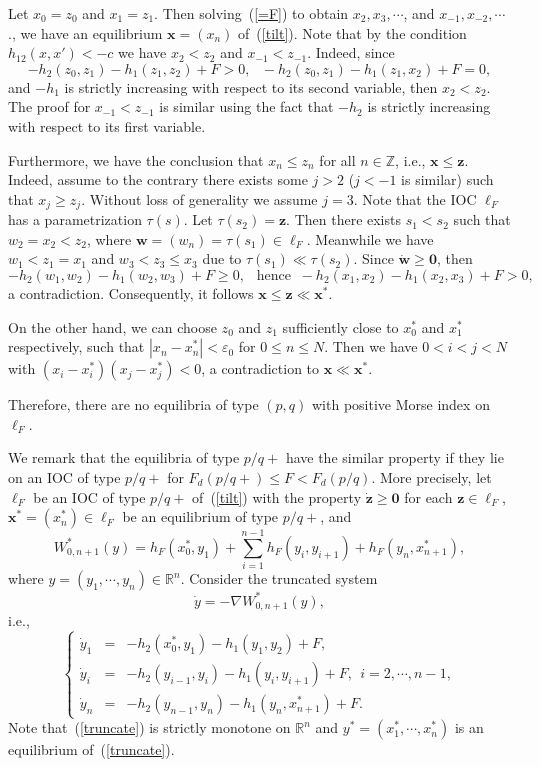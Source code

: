 \documentclass[12pt]{article}
\newcommand{\R}{\mathbb{R}}
\newcommand{\Z}{\mathbb{Z}}
\newcommand{\eps}{\varepsilon}
\newcommand{\begeq}{\begin{equation}}
\newcommand{\eeq}{\end{equation}}
\newcommand{\emark}{\hfill\hspace{1em}\framebox[0.5em]{\rule{0cm}{0em}}
\vspace{2mm}}
\newcommand{\refer}[1]{~(\ref{#1})}
\newcommand{\wbf}{{\mathbf{w}}}
\newcommand{\zbf}{{\mathbf{z}}}
\newcommand{\xbf}{{\mathbf{x}}}
\newcommand{\zero}{{\mathbf{0}}}
\begin{document}
Let $x_0=z_0$ and $x_1=z_1$. Then solving\refer{=F} to obtain $x_2,x_3,\cdots$, and $x_{-1},x_{-2},\cdots$., we have an equilibrium $\xbf=(x_n)$ of\refer{tilt}. Note that by the condition $h_{12}(x,x')<-c$ we have $x_2<z_2$ and $x_{-1}<z_{-1}$. Indeed, since
$$
-h_2(z_0,z_1)-h_1(z_1,z_2)+F>0,\ \ \
-h_2(z_0,z_1)-h_1(z_1,x_2)+F=0,
$$
and $-h_1$ is strictly increasing with respect to its second variable, then $x_2<z_2$. The proof for $x_{-1}<z_{-1}$ is similar using the fact that $-h_2$ is strictly increasing with respect to its first variable.

Furthermore, we have the conclusion that $x_n\leq z_n$ for all $n\in\Z$, i.e., $\xbf\leq \zbf$. Indeed, assume to the contrary there exists some $j>2$ ($j<-1$ is similar) such that $x_j\geq z_j$. Without loss of generality we assume $j=3$. Note that the IOC $\ell_F$ has a parametrization $\tau(s)$. Let $\tau(s_2)=\zbf$. Then there exists $s_1<s_2$ such that $w_2=x_2<z_2$, where $\wbf=(w_n)=\tau(s_1)\in\ell_F$. Meanwhile we have $w_1<z_1=x_1$ and $w_3<z_3\leq x_3$ due to $\tau(s_1)\ll\tau(s_2)$. Since $\dot{\wbf}\geq \zero$, then
$$
-h_2(w_1,w_2)-h_1(w_2,w_3)+F\geq 0, \ \ \mbox{ hence }\
-h_2(x_1,x_2)-h_1(x_2,x_3)+F>0,
$$
a contradiction. Consequently, it follows $\xbf\leq \zbf\ll\xbf^*$.

On the other hand, we can choose $z_0$ and $z_1$ sufficiently close to $x_0^*$ and $x_1^*$ respectively, such that $|x_n-x_n^*|<\eps_0$ for $0\leq n\leq N$. Then we have $0<i<j<N$ with $(x_i-x_i^*)(x_j-x_j^*)<0$, a contradiction to $\xbf\ll\xbf^*$.

Therefore, there are no  equilibria of type $(p,q)$ with positive Morse index on $\ell_F$.\emark


We remark that the equilibria of type $p/q+$ have the similar property if they lie on an IOC of type $p/q+$ for $F_d(p/q+)\leq F<F_d(p/q)$. More precisely,
let $\ell_F$ be an IOC of type $p/q+$ of\refer{tilt} with the property $\dot{\zbf}\geq \zero$ for each $\zbf\in\ell_F$, $\xbf^*=(x_n^*)\in\ell_F$ be an equilibrium of type $p/q+$, and
$$
W_{0,n+1}^*(y)=h_F(x_0^*,y_1)+\sum_{i=1}^{n-1}h_F(y_i,y_{i+1})+h_F(y_n,x_{n+1}^*),
$$
where $y=(y_1, \cdots,y_n)\in\R^n$. Consider the truncated system
$$
\dot{y}=-\nabla W_{0,n+1}^*(y),
$$
i.e.,
\begeq\label{truncate}
\left\{
\begin{array}{lll}
\dot{y}_1 &= & -h_2(x_0^*,y_1)-h_1(y_1,y_2)+F,\\[4pt]
\dot{y}_i &= & -h_2(y_{i-1},y_i)-h_1(y_i,y_{i+1})+F,\ \ i=2,\cdots,n-1,\\[4pt]
\dot{y}_n &= & -h_2(y_{n-1},y_n)-h_1(y_n,x_{n+1}^*)+F.
\end{array}
\right.
\eeq
Note that\refer{truncate} is strictly monotone on $\R^n$ and $y^*=(x_1^*,\cdots,x_n^*)$ is an equilibrium of\refer{truncate}.
\end{document}
